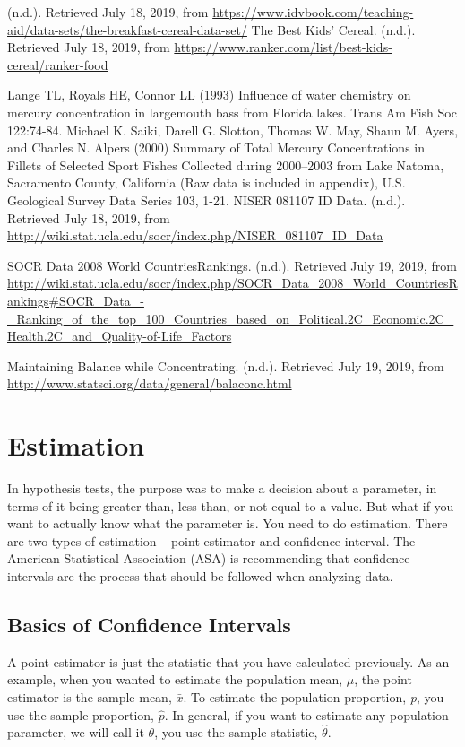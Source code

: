 \documentclass[
]{book}
\begin{document}
(n.d.). Retrieved July 18, 2019, from \url{https://www.idvbook.com/teaching-aid/data-sets/the-breakfast-cereal-data-set/}
The Best Kids' Cereal. (n.d.). Retrieved July 18, 2019, from \url{https://www.ranker.com/list/best-kids-cereal/ranker-food}

Lange TL, Royals HE, Connor LL (1993) Influence of water chemistry on mercury concentration in largemouth bass from Florida lakes. Trans Am Fish Soc 122:74-84.
Michael K. Saiki, Darell G. Slotton, Thomas W. May, Shaun M. Ayers, and Charles N. Alpers (2000) Summary of Total Mercury Concentrations in Fillets of Selected Sport Fishes Collected during 2000--2003 from Lake Natoma, Sacramento County, California (Raw data is included in appendix), U.S. Geological Survey Data Series 103, 1-21.
NISER 081107 ID Data. (n.d.). Retrieved July 18, 2019, from \url{http://wiki.stat.ucla.edu/socr/index.php/NISER_081107_ID_Data}

SOCR Data 2008 World CountriesRankings. (n.d.). Retrieved July 19, 2019, from \url{http://wiki.stat.ucla.edu/socr/index.php/SOCR_Data_2008_World_CountriesRankings\#SOCR_Data_-_Ranking_of_the_top_100_Countries_based_on_Political.2C_Economic.2C_Health.2C_and_Quality-of-Life_Factors}

Maintaining Balance while Concentrating. (n.d.). Retrieved July 19, 2019, from \url{http://www.statsci.org/data/general/balaconc.html}

\hypertarget{estimation}{%
\chapter{Estimation}\label{estimation}}

In hypothesis tests, the purpose was to make a decision about a parameter, in terms of it being greater than, less than, or not equal to a value. But what if you want to actually know what the parameter is. You need to do estimation. There are two types of estimation -- point estimator and confidence interval. The American Statistical Association (ASA) is recommending that confidence intervals are the process that should be followed when analyzing data.

\hypertarget{basics-of-confidence-intervals}{%
\section{Basics of Confidence Intervals}\label{basics-of-confidence-intervals}}

A point estimator is just the statistic that you have calculated previously. As an example, when you wanted to estimate the population mean, \(\mu\), the point estimator is the sample mean, \(\bar{x}\). To estimate the population proportion, \emph{p}, you use the sample proportion, \(\hat{p}\). In general, if you want to estimate any population parameter, we will call it \(\theta\), you use the sample statistic, \(\hat{\theta}\).
\end{document}
